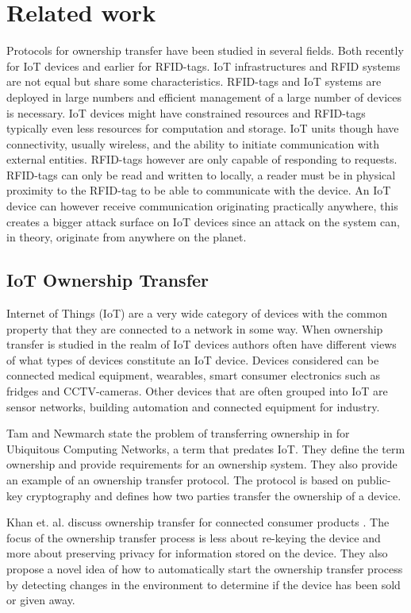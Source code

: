 {\section{Related work}
\label{RelatedWork}

Protocols for ownership transfer have been studied in several fields. Both recently for IoT devices and earlier for RFID-tags. IoT infrastructures and RFID systems are not equal but share some characteristics. RFID-tags and IoT systems are deployed in large numbers and efficient management of a large number of devices is necessary. IoT devices might have constrained resources and RFID-tags typically even less resources for computation and storage. IoT units though have connectivity, usually wireless, and the ability to initiate communication with external entities. RFID-tags however are only capable of responding to requests.
RFID-tags can only be read and written to locally, a reader must be in physical proximity to the RFID-tag to be able to communicate with the device. An IoT device can however receive communication originating practically anywhere, this creates a bigger attack surface on IoT devices since an attack on the system can, in theory, originate from anywhere on the planet.

\subsection{IoT Ownership Transfer}
Internet of Things (IoT) are a very wide category of devices with the common property that they are connected to a network in some way. When ownership transfer is studied in the realm of IoT devices authors often have different views of what types of devices constitute an IoT device. Devices considered can be connected medical equipment, wearables, smart consumer electronics such as fridges and CCTV-cameras. Other devices that are often grouped into IoT are sensor networks, building automation and connected equipment for industry. 

Tam and Newmarch state the problem of transferring ownership in  \cite{tam2004protocol} for Ubiquitous Computing Networks, a term that predates IoT. They define the term ownership and provide requirements for an ownership system. They also provide an example of an ownership transfer protocol. The protocol is based on public-key cryptography and defines how two parties transfer the ownership of a device. 

Khan et. al. discuss ownership transfer for connected consumer products\cite{Khan2019} . The focus of the ownership transfer process is less about re-keying the device and more about preserving privacy for information stored on the device. They also propose a novel idea of  how to automatically start the ownership transfer process by detecting changes in the environment to determine if the device has been sold or given away. 

}
